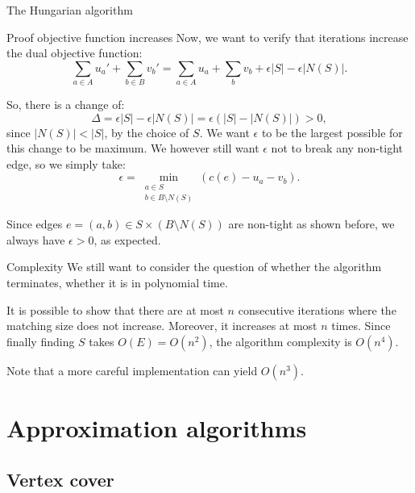 \documentclass[a4paper]{article}
\begin{document}
\begin{parag}{The Hungarian algorithm}
    \begin{subparag}{Proof objective function increases}
        Now, we want to verify that iterations increase the dual objective function: 
        \[\sum_{a \in A} u_a' + \sum_{b \in B} v_b' = \sum_{a \in A} u_a + \sum_{b} v_b + \epsilon\left|S\right| - \epsilon \left|N\left(S\right)\right|.\]
        
        So, there is a change of: 
        \[\Delta = \epsilon \left|S\right| - \epsilon \left|N\left(S\right)\right| = \epsilon \left(\left|S\right| - \left|N\left(S\right)\right|\right)> 0,\]
        since $\left|N\left(S\right)\right| < \left|S\right|$, by the choice of $S$. We want $\epsilon$ to be the largest possible for this change to be maximum. We however still want $\epsilon$ not to break any non-tight edge, so we simply take: 
        \[\epsilon = \min_{\substack{a \in S \\ b \in B \setminus N\left(S\right)}} \left(c\left(e\right) - u_a - v_b\right).\]

        Since edges $e = \left(a, b\right) \in S \times \left(B \setminus N\left(S\right)\right)$ are non-tight as shown before, we always have $\epsilon > 0$, as expected.
    \end{subparag}

    \begin{subparag}{Complexity}
        We still want to consider the question of whether the algorithm terminates, whether it is in polynomial time.

        It is possible to show that there are at most $n$ consecutive iterations where the matching size does not increase. Moreover, it increases at most $n$ times. Since finally finding $S$ takes $O\left(E\right) = O\left(n^2\right)$, the algorithm complexity is $O\left(n^4\right)$.

        Note that a more careful implementation can yield $O\left(n^3\right)$.
    \end{subparag}
\end{parag}

\section{Approximation algorithms}
\subsection{Vertex cover}
\end{document}
